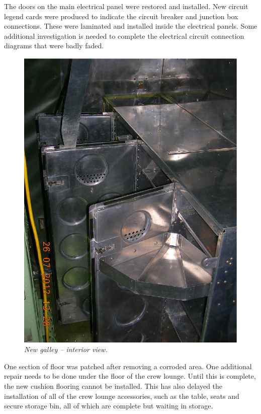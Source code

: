 The doors on the main electrical panel were restored and installed.
New circuit legend cards were produced to indicate the circuit breaker
and junction box connections.  These were laminated and installed
inside the electrical panels.  Some additional investigation is needed
to complete the electrical circuit connection diagrams that were badly
faded.

\begin{figure}[htbp]
   \vspace{2em}
   \centering
   \includegraphics[scale=0.5]{galley_interior.eps}
   \caption*{\small \em New galley -- interior view.}
   \label{fig:galley_interior}
\end{figure}

One section of floor was patched after removing a corroded area.  One
additional repair needs to be done under the floor of the crew lounge.
Until this is complete, the new cushion flooring cannot be
installed. This has also delayed the installation of all of the crew
lounge accessories, such as the table, seats and secure storage bin,
all of which are complete but waiting in storage.


